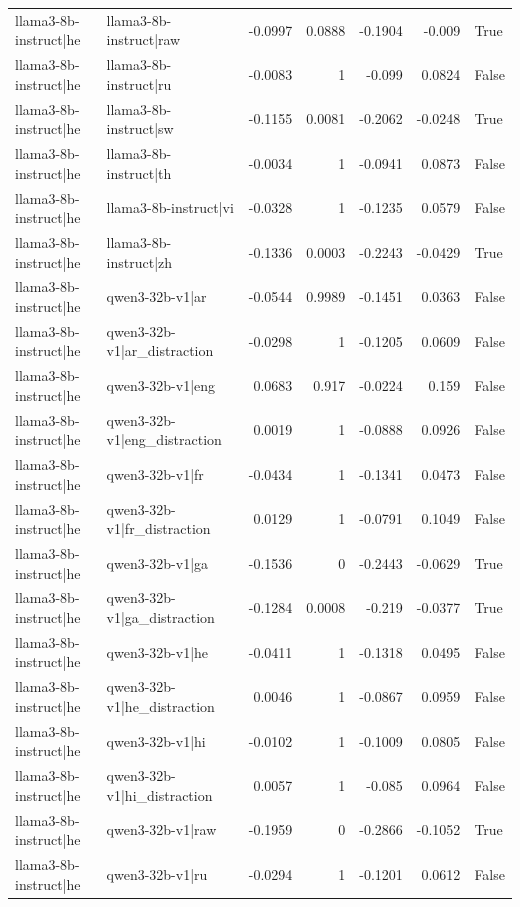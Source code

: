 \begin{table}
\begin{tabular}{l l r r r r l}
llama3-8b-instruct|he & llama3-8b-instruct|raw & -0.0997 & 0.0888 & -0.1904 & -0.009 & True \\
llama3-8b-instruct|he & llama3-8b-instruct|ru & -0.0083 & 1 & -0.099 & 0.0824 & False \\
llama3-8b-instruct|he & llama3-8b-instruct|sw & -0.1155 & 0.0081 & -0.2062 & -0.0248 & True \\
llama3-8b-instruct|he & llama3-8b-instruct|th & -0.0034 & 1 & -0.0941 & 0.0873 & False \\
llama3-8b-instruct|he & llama3-8b-instruct|vi & -0.0328 & 1 & -0.1235 & 0.0579 & False \\
llama3-8b-instruct|he & llama3-8b-instruct|zh & -0.1336 & 0.0003 & -0.2243 & -0.0429 & True \\
llama3-8b-instruct|he & qwen3-32b-v1|ar & -0.0544 & 0.9989 & -0.1451 & 0.0363 & False \\
llama3-8b-instruct|he & qwen3-32b-v1|ar_distraction & -0.0298 & 1 & -0.1205 & 0.0609 & False \\
llama3-8b-instruct|he & qwen3-32b-v1|eng & 0.0683 & 0.917 & -0.0224 & 0.159 & False \\
llama3-8b-instruct|he & qwen3-32b-v1|eng_distraction & 0.0019 & 1 & -0.0888 & 0.0926 & False \\
llama3-8b-instruct|he & qwen3-32b-v1|fr & -0.0434 & 1 & -0.1341 & 0.0473 & False \\
llama3-8b-instruct|he & qwen3-32b-v1|fr_distraction & 0.0129 & 1 & -0.0791 & 0.1049 & False \\
llama3-8b-instruct|he & qwen3-32b-v1|ga & -0.1536 & 0 & -0.2443 & -0.0629 & True \\
llama3-8b-instruct|he & qwen3-32b-v1|ga_distraction & -0.1284 & 0.0008 & -0.219 & -0.0377 & True \\
llama3-8b-instruct|he & qwen3-32b-v1|he & -0.0411 & 1 & -0.1318 & 0.0495 & False \\
llama3-8b-instruct|he & qwen3-32b-v1|he_distraction & 0.0046 & 1 & -0.0867 & 0.0959 & False \\
llama3-8b-instruct|he & qwen3-32b-v1|hi & -0.0102 & 1 & -0.1009 & 0.0805 & False \\
llama3-8b-instruct|he & qwen3-32b-v1|hi_distraction & 0.0057 & 1 & -0.085 & 0.0964 & False \\
llama3-8b-instruct|he & qwen3-32b-v1|raw & -0.1959 & 0 & -0.2866 & -0.1052 & True \\
llama3-8b-instruct|he & qwen3-32b-v1|ru & -0.0294 & 1 & -0.1201 & 0.0612 & False \\

\end{tabular}
\end{table}
